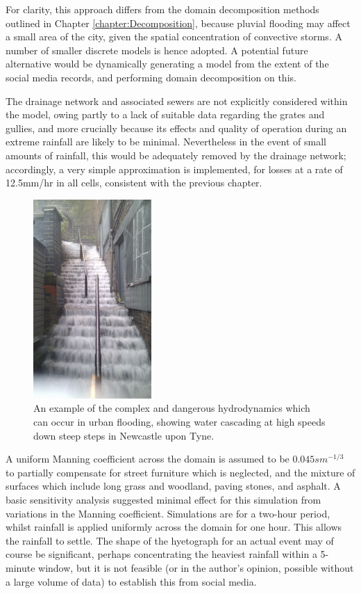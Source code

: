 For clarity, this approach differs from the domain decomposition methods outlined in Chapter \ref{chapter:Decomposition}, because pluvial flooding may affect a small area of the city, given the spatial concentration of convective storms. A number of smaller discrete models is hence adopted. A potential future alternative would be dynamically generating a model from the extent of the social media records, and performing domain decomposition on this.

The drainage network and associated sewers are not explicitly considered within the model, owing partly to a lack of suitable data regarding the grates and gullies, and more crucially because its effects and quality of operation during an extreme rainfall are likely to be minimal. Nevertheless in the event of small amounts of rainfall, this would be adequately removed by the drainage network; accordingly, a very simple approximation is implemented, for losses at a rate of 12.5mm/hr in all cells, consistent with the previous chapter.

\begin{figure}[tpb]
	\centering
	\includegraphics[width=0.4\textwidth]{nowcasting-figures/nclsm-example-supercritical.jpg}
	\caption{An example of the complex and dangerous hydrodynamics which can occur in urban flooding, showing water cascading at high speeds down steep steps in Newcastle upon Tyne.}
	\label{NclSM-Example-Supercritical}
\end{figure}

A uniform Manning coefficient across the domain is assumed to be $0.045 s m^{-1/3}$ to partially compensate for street furniture which is neglected, and the mixture of surfaces which include long grass and woodland, paving stones, and asphalt. A basic sensitivity analysis suggested minimal effect for this simulation from variations in the Manning coefficient. Simulations are for a two-hour period, whilst rainfall is applied uniformly across the domain for one hour. This allows the rainfall to settle. The shape of the hyetograph for an actual event may of course be significant, perhaps concentrating the heaviest rainfall within a 5-minute window, but it is not feasible (or in the author's opinion, possible without a large volume of data) to establish this from social media. 

